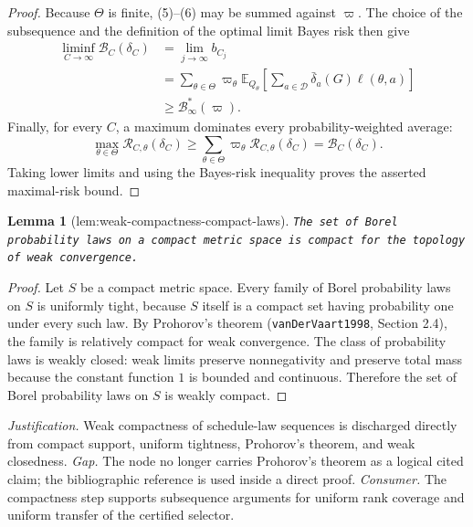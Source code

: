 \documentclass{article}
\newtheorem{lemma}{Lemma}
\begin{document}
\begin{proof}
Because \(\Theta\) is finite, (5)--(6) may be summed against \(\varpi\).  The choice of the subsequence and the definition of the optimal limit Bayes risk then give
\[
 \begin{aligned}
 \liminf_{C\to\infty}\mathcal B_C(\delta_C)
 &=\lim_{j\to\infty}b_{C_j}\\
 &=\sum_{\theta\in\Theta}\varpi_\theta
   \mathbb E_{Q_\theta}\!\left[
     \sum_{a\in\mathcal D}\bar\delta_a(G)\ell(\theta,a)
   \right]\\
 &\geq \mathcal B_\infty^*(\varpi).
 \end{aligned}
\]
Finally, for every \(C\), a maximum dominates every probability-weighted average:
\[
 \max_{\theta\in\Theta}\mathcal R_{C,\theta}(\delta_C)
 \geq
 \sum_{\theta\in\Theta}\varpi_\theta
 \mathcal R_{C,\theta}(\delta_C)
 =\mathcal B_C(\delta_C).
\]
Taking lower limits and using the Bayes-risk inequality proves the asserted maximal-risk bound.
\end{proof}

\begin{lemma}[lem:weak-compactness-compact-laws]\label{lem:weak-compactness-compact-laws}
\texttt{The set of Borel probability laws on a compact metric space is compact for the topology of weak convergence.}
\end{lemma}
\begin{proof}
Let \(S\) be a compact metric space.  Every family of Borel probability laws on \(S\) is uniformly tight, because \(S\) itself is a compact set having probability one under every such law.  By Prohorov's theorem (\texttt{vanDerVaart1998}, Section 2.4), the family is relatively compact for weak convergence.  The class of probability laws is weakly closed: weak limits preserve nonnegativity and preserve total mass because the constant function \(1\) is bounded and continuous.  Therefore the set of Borel probability laws on \(S\) is weakly compact.
\end{proof}
\par\smallskip\noindent \textit{Justification.} Weak compactness of schedule-law sequences is discharged directly from compact support, uniform tightness, Prohorov's theorem, and weak closedness. \textit{Gap.} The node no longer carries Prohorov's theorem as a logical cited claim; the bibliographic reference is used inside a direct proof. \textit{Consumer.} The compactness step supports subsequence arguments for uniform rank coverage and uniform transfer of the certified selector.
\end{document}
